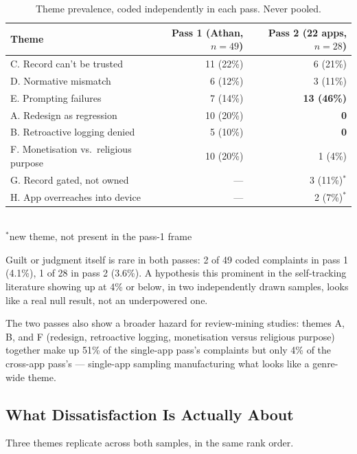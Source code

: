\begin{table}[t]
  \centering
  \small
  \caption{Theme prevalence, coded independently in each pass. Never pooled.}
  \label{tab:rq1-themes}
  \begin{tabular}{lrr}
    \toprule
    Theme & Pass 1 (Athan, \(n{=}49\)) & Pass 2 (22 apps, \(n{=}28\)) \\
    \midrule
    C. Record can't be trusted        & 11 (22\%) & 6 (21\%) \\
    D. Normative mismatch             & 6 (12\%)  & 3 (11\%) \\
    E. Prompting failures             & 7 (14\%)  & \textbf{13 (46\%)} \\
    A. Redesign as regression         & 10 (20\%) & \textbf{0} \\
    B. Retroactive logging denied     & 5 (10\%)  & \textbf{0} \\
    F. Monetisation vs.\ religious purpose & 10 (20\%) & 1 (4\%) \\
    G. Record gated, not owned        & ---       & 3 (11\%)\(^\ast\) \\
    H. App overreaches into device    & ---       & 2 (7\%)\(^\ast\) \\
    \bottomrule
  \end{tabular}
  \\[2pt]
  {\footnotesize \(^\ast\)new theme, not present in the pass-1 frame}
\end{table}

Guilt or judgment itself is rare in both passes: 2 of 49 coded complaints in
pass 1 (4.1\%), 1 of 28 in pass 2 (3.6\%). A hypothesis this prominent in the
self-tracking literature showing up at 4\% or below, in two independently drawn
samples, looks like a real null result, not an underpowered one.

The two passes also show a broader hazard for review-mining studies: themes A,
B, and F (redesign, retroactive logging, monetisation versus religious
purpose) together make up 51\% of the single-app pass's complaints but only
4\% of the cross-app pass's --- single-app sampling manufacturing what looks
like a genre-wide theme.

\subsection{What Dissatisfaction Is Actually About}

Three themes replicate across both samples, in the same rank order.


